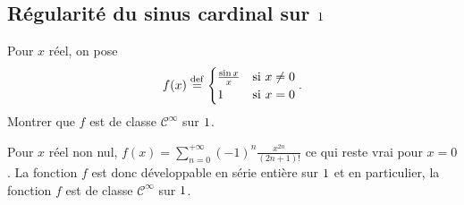 \subsection{Régularité du sinus cardinal sur $1$}

\begin{exercice}
    Pour $x$ réel, on pose 
    $$f(x) \overset{\mathrm{\tiny def}}{=}
    \begin{cases} 
        \frac{\sin x}{x} &\text{si } x \not= 0 \\ 
        1 &\text{si } x = 0 
    \end{cases}.$$ 
    Montrer que $f$ est de classe $\mathscr{C}^\infty$ sur $1$.
\end{exercice}

\begin{solution}
    Pour $x$ réel non nul, $f(x) = \sum\limits_{n=0}^{+ \infty} (-1)^n \frac{x^{2n}}{(2n+1)!}$ ce qui reste vrai pour $x = 0$. La fonction $f$ est donc développable en série entière sur $1$ et en particulier, la fonction $f$ est de classe $\mathscr{C}^\infty$ sur $1$.
\end{solution}


